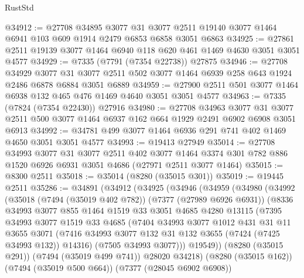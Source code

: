 \begin{lexlean}{RustStd}
\begin{coremodule}
@34912 := @27708
    @34895
    @3077
    @31
    @3077
    @2511
    @19140
    @3077
    @1464
    @6941
    @103
    @609
    @1914
    @2479
    @6853
    @6858
    @3051
    @6863
@34925 := @27861 @2511 @19139 @3077 @1464 @6940 @118 @620 @461 @1469 @4630 @3051 @3051 @4577
@34929 := @7335 (@7791 (@7354 @22738)) @27875
@34946 := @27708
    @34929
    @3077
    @31
    @3077
    @2511
    @502
    @3077
    @1464
    @6939
    @258
    @643
    @1924
    @2486
    @6878
    @6884
    @3051
    @6889
@34959 := @27900 @2511 @501 @3077 @1464 @6938 @132 @465 @476 @1469 @4640 @3051 @3051 @4577
@34963 := @7335 (@7824 (@7354 @22430)) @27916
@34980 := @27708
    @34963
    @3077
    @31
    @3077
    @2511
    @500
    @3077
    @1464
    @6937
    @162
    @664
    @1929
    @2491
    @6902
    @6908
    @3051
    @6913
@34992 := @34781 @499 @3077 @1464 @6936 @291 @741 @402 @1469 @4650 @3051 @3051 @4577
@34993 := @19413 @27949
@35014 := @27708
    @34993
    @3077
    @31
    @3077
    @2511
    @402
    @3077
    @1464
    @3374
    @301
    @782
    @886
    @1520
    @6926
    @6931
    @3051
    @4686
    (@27971 @2511 @3077 @1464)
@35015 := @8300 @2511
@35018 := @35014 (@8280 (@35015 @301))
@35019 := @19445 @2511
@35286 := @34891
    (@34912
      (@34925
        (@34946
          (@34959
            (@34980
              (@34992
                (@35018
                  (@7494 (@35019 @402 @782))
                  (@7377 (@27989 @6926 @6931))
                  (@8336
                    @34993
                    @3077
                    @855
                    @1464
                    @1519
                    @33
                    @3051
                    @4685
                    @4280
                    @13115
                    (@7395
                      @34993
                      @3077
                      @1519
                      @33
                      @4685
                      (@7404
                        @34993
                        @3077
                        @1012
                        @431
                        @31
                        @11
                        @3655
                        @3071
                        (@7416 @34993 @3077 @132 @31 @132 @3655 (@7424 (@7425 @34993 @132)) @14316)
                        (@7505 @34993 @3077)))
                    @19549))
                (@8280 (@35015 @291))
                (@7494 (@35019 @499 @741))
                @28020
                @34218)
              (@8280 (@35015 @162))
              (@7494 (@35019 @500 @664))
              (@7377 (@28045 @6902 @6908))

\end{coremodule}
\end{lexlean}

